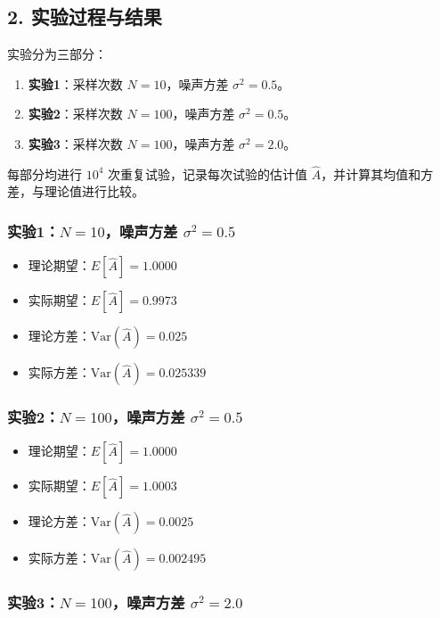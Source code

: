 \documentclass[12pt]{ctexart}
\begin{document}
\subsection*{2. 实验过程与结果}

实验分为三部分：

\begin{enumerate}
    \item \textbf{实验1}：采样次数 \( N = 10 \)，噪声方差 \( \sigma^2 = 0.5 \)。
    \item \textbf{实验2}：采样次数 \( N = 100 \)，噪声方差 \( \sigma^2 = 0.5 \)。
    \item \textbf{实验3}：采样次数 \( N = 100 \)，噪声方差 \( \sigma^2 = 2.0 \)。
\end{enumerate}

每部分均进行 \( 10^4 \) 次重复试验，记录每次试验的估计值 \( \hat{A} \)，并计算其均值和方差，与理论值进行比较。

\subsubsection*{实验1：\( N = 10 \)，噪声方差 \( \sigma^2 = 0.5 \)}

\begin{itemize}
    \item 理论期望：\( E[\hat{A}] = 1.0000 \)
    \item 实际期望：\( E[\hat{A}] = 0.9973 \)
    \item 理论方差：\( \text{Var}(\hat{A}) = 0.025 \)
    \item 实际方差：\( \text{Var}(\hat{A}) = 0.025339 \)
\end{itemize}

\subsubsection*{实验2：\( N = 100 \)，噪声方差 \( \sigma^2 = 0.5 \)}

\begin{itemize}
    \item 理论期望：\( E[\hat{A}] = 1.0000 \)
    \item 实际期望：\( E[\hat{A}] = 1.0003 \)
    \item 理论方差：\( \text{Var}(\hat{A}) = 0.0025 \)
    \item 实际方差：\( \text{Var}(\hat{A}) = 0.002495 \)
\end{itemize}

\subsubsection*{实验3：\( N = 100 \)，噪声方差 \( \sigma^2 = 2.0 \)}
\end{document}
